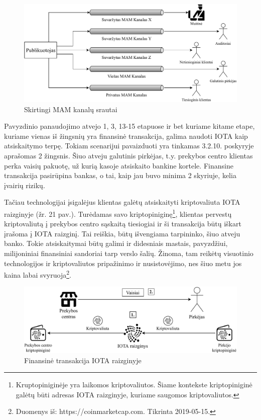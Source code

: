 \begin{figure}[H]
    \centering
    \includegraphics[scale=0.8]{images/mam-channel-flows}
    \caption{Skirtingi MAM kanalų srautai}
\end{figure}

Pavyzdinio panaudojimo atvejo 1, 3, 13-15 etapuose ir bet kuriame kitame etape, kuriame vienas iš žingsnių yra finansinė transakcija, galima naudoti IOTA kaip atsiskaitymo terpę. Tokiam scenarijui pavaizduoti yra tinkamas 3.2.10. poskyryje aprašomas 2 žingsnis. Šiuo atveju galutinis pirkėjas, t.y. prekybos centro klientas perka vaisių pakuotę, už kurią kasoje atsiskaito bankine kortele. Finansine transakcija pasirūpina bankas, o tai, kaip jau buvo minima 2 skyriuje, kelia įvairių rizikų.

Tačiau technologijai įsigalėjus klientas galėtų atsiskaityti kriptovaliuta IOTA raizginyje (žr. 21 pav.). Turėdamas savo kriptopiniginę\footnote{Kruptopiniginėje yra laikomos kriptovaliutos. Šiame kontekste kriptopiniginė galėtų būti adresas IOTA raizginyje, kuriame saugomos kriptovaliutos.}, klientas pervestų kriptovaliutą į prekybos centro sąskaitą tiesiogiai ir ši transakcija būtų iškart įrašoma į IOTA raizginį. Tai reiškia, būtų išvengiama tarpininko, šiuo atveju banko. Tokie atsiskaitymai būtų galimi ir didesniais mastais, pavyzdžiui, milijoniniai finansiniai sandoriai tarp verslo šalių. Žinoma, tam reikėtų visuotinio technologijos ir kriptovaliutos pripažinimo ir nusistovėjimo, nes šiuo metu jos kaina labai svyruoja\footnote{Duomenys iš: https://coinmarketcap.com. Tikrinta 2019-05-15.}.

\begin{figure}[H]
    \centering
    \includegraphics[scale=0.75]{images/tangle-financial-transaction}
    \caption{Finansinė transakcija IOTA raizginyje}
\end{figure}

